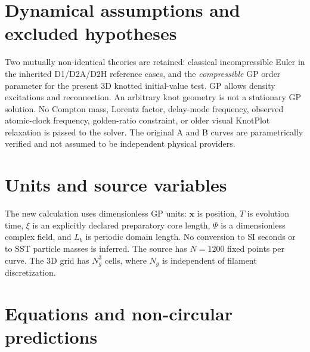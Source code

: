 \documentclass[10pt,a4paper]{article}
\begin{document}
\section{Dynamical assumptions and excluded hypotheses}
Two mutually non-identical theories are retained: classical incompressible Euler in the inherited D1/D2A/D2H reference cases, and the \emph{compressible} GP order parameter for the present 3D knotted initial-value test. GP allows density excitations and reconnection. An arbitrary knot geometry is not a stationary GP solution. No Compton mass, Lorentz factor, delay-mode frequency, observed atomic-clock frequency, golden-ratio constraint, or older visual KnotPlot relaxation is passed to the solver. The original A and B curves are parametrically verified and not assumed to be independent physical providers.
\section{Units and source variables}
The new calculation uses dimensionless GP units: $\mathbf{x}$ is position, $T$ is evolution time, $\xi$ is an explicitly declared preparatory core length, $\Psi$ is a dimensionless complex field, and $L_b$ is periodic domain length. No conversion to SI seconds or to SST particle masses is inferred. The source has $N=1200$ fixed points per curve. The 3D grid has $N_g^3$ cells, where $N_g$ is independent of filament discretization.
\section{Equations and non-circular predictions}
\end{document}
